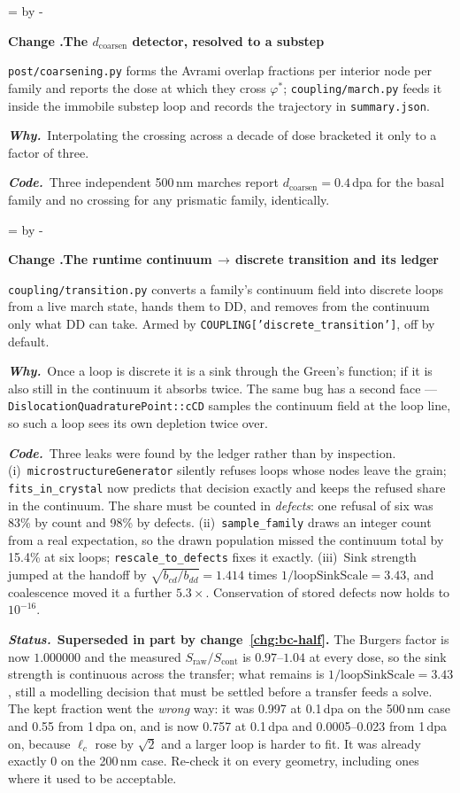 \documentclass[11pt,a4paper]{article}
\newcommand{\code}[1]{\texttt{\small #1}}
\newcommand{\needlines}[1]{%
  \par\dimen0=\pagegoal \advance\dimen0 by -\pagetotal
  \ifdim\dimen0<#1\baselineskip \newpage \fi}
\newcounter{chg}
\newcommand{\change}[1]{%
  \needlines{4}%
  \refstepcounter{chg}%
  \par\medskip\noindent
  {\bfseries\boldmath Change \thechg.\quad #1}%
  \par\nobreak\smallskip}
\newcommand{\why}[1]{\par\noindent\textbf{\itshape Why.}\ #1\par}
\newcommand{\impact}[1]{\par\noindent\textbf{\itshape Code.}\ #1\par}
\newcommand{\status}[1]{\par\noindent\textbf{\itshape Status.}\ #1\par}
\begin{document}
\change{The $d_{\text{coarsen}}$ detector, resolved to a substep}
\label{chg:dcoarsen}
\code{post/coarsening.py} forms the Avrami overlap fractions per interior node
per family and reports the dose at which they cross $\varphi^\ast$;
\code{coupling/march.py} feeds it inside the immobile substep loop and records
the trajectory in \code{summary.json}.
\why{Interpolating the crossing across a decade of dose bracketed it only to a
factor of three.}
\impact{Three independent 500\,nm marches report $d_{\text{coarsen}}=0.4$\,dpa
for the basal family and no crossing for any prismatic family, identically.}

\change{The runtime continuum\,$\rightarrow$\,discrete transition and its ledger}
\label{chg:transition}
\code{coupling/transition.py} converts a family's continuum field into discrete
loops from a live march state, hands them to DD, and removes from the continuum
only what DD can take. Armed by \code{COUPLING['discrete\_transition']}, off by
default.
\why{Once a loop is discrete it is a sink through the Green's function; if it
is also still in the continuum it absorbs twice. The same bug has a second
face --- \code{DislocationQuadraturePoint::cCD} samples the continuum field at
the loop line, so such a loop sees its own depletion twice over.}
\impact{Three leaks were found by the ledger rather than by inspection.
(i)~\code{microstructureGenerator} silently refuses loops whose nodes leave the
grain; \code{fits\_in\_crystal} now predicts that decision exactly and keeps
the refused share in the continuum. The share must be counted in
\emph{defects}: one refusal of six was 83\% by count and 98\% by defects.
(ii)~\code{sample\_family} draws an integer count from a real expectation, so
the drawn population missed the continuum total by 15.4\% at six loops;
\code{rescale\_to\_defects} fixes it exactly. (iii)~Sink strength jumped at the
handoff by $\sqrt{b_{cd}/b_{dd}}=1.414$ times $1/\text{loopSinkScale}=3.43$,
and coalescence moved it a further $5.3\times$. Conservation of stored defects
now holds to $10^{-16}$.}
\status{\textbf{Superseded in part by change~\ref{chg:bc-half}.} The Burgers
factor is now $1.000000$ and the measured $S_{\text{raw}}/S_{\text{cont}}$ is
$0.97$--$1.04$ at every dose, so the sink strength is continuous across the
transfer; what remains is $1/\text{loopSinkScale}=3.43$, still a modelling
decision that must be settled before a transfer feeds a solve. The kept fraction
went the \emph{wrong} way: it was 0.997 at 0.1\,dpa on the 500\,nm case and 0.55
from 1\,dpa on, and is now 0.757 at 0.1\,dpa and 0.0005--0.023 from 1\,dpa on,
because $\ell_c$ rose by $\sqrt2$ and a larger loop is harder to fit. It was
already exactly 0 on the 200\,nm case. Re-check it on every geometry, including
ones where it used to be acceptable.}
\end{document}
